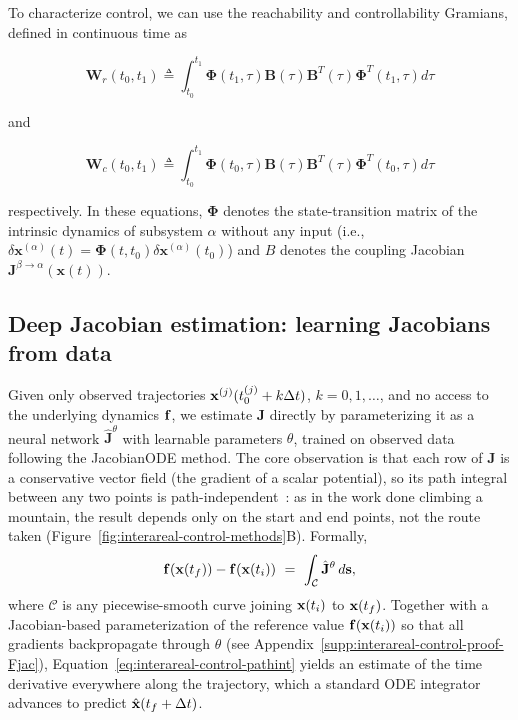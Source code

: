 To characterize control, we can use the reachability and controllability Gramians, defined in continuous time as

\begin{equation}
\mathbf{W}_r(t_0, t_1) \triangleq \int_{t_0}^{t_1}\mathbf{\Phi}(t_1, \tau)\mathbf{B} (\tau)\mathbf{B}^T(\tau){\mathbf{\Phi}}^T(t_1, \tau) d\tau
\end{equation}

and

\begin{equation}
\mathbf{W}_c(t_0, t_1) \triangleq \int_{t_0}^{t_1}\mathbf{\Phi}(t_0, \tau)\mathbf{B} (\tau)\mathbf{B}^T(\tau){\mathbf{\Phi}}^T(t_0, \tau) d\tau
\end{equation}

respectively. In these equations, $\mathbf{\Phi}$ denotes the state-transition matrix of the intrinsic dynamics of subsystem $\alpha$ without any input (i.e., $\delta\mathbf{x}^{(\alpha)}(t) = \mathbf{\Phi}(t, t_0)\delta\mathbf{x}^{(\alpha)}(t_0)$) and $B$ denotes the coupling Jacobian $\mathbf{J}^{\beta\to\alpha}(\mathbf{x}(t))$.\cite{Antsaklis2006-wl}

\subsection{Deep Jacobian estimation: learning Jacobians from data}

Given only observed trajectories $\vb{x}^{(j)}(t_0^{(j)} + k\Delta t)$, $k=0,1,\dots$, and no access to the underlying dynamics $\vb{f}$, we estimate $\mathbf{J}$ directly by parameterizing it as a neural network $\hat{\mathbf{J}}^{\theta}$ with learnable parameters $\theta$, trained on observed data following the JacobianODE method.\cite{Eisen2025-wt} The core observation is that each row of $\mathbf{J}$ is a conservative vector field (the gradient of a scalar potential), so its path integral between any two points is path-independent~\cite{Lorraine2024-qe,Beik-Mohammadi2024-mg}: as in the work done climbing a mountain, the result depends only on the start and end points, not the route taken (Figure~\ref{fig:interareal-control-methods}B). Formally,
\begin{equation}
\vb{f}(\vb{x}(t_f)) - \vb{f}(\vb{x}(t_i)) \ =\ \int_{\mathcal{C}}\hat{\mathbf{J}}^{\theta}\, d\vb{s},
\label{eq:interareal-control-pathint}
\end{equation}
where $\mathcal{C}$ is any piecewise-smooth curve joining $\vb{x}(t_i)$ to $\vb{x}(t_f)$. Together with a Jacobian-based parameterization of the reference value $\vb{f}(\vb{x}(t_i))$ so that all gradients backpropagate through $\theta$ (see Appendix~\ref{supp:interareal-control-proof-Fjac}), Equation~\ref{eq:interareal-control-pathint} yields an estimate of the time derivative everywhere along the trajectory, which a standard ODE integrator advances to predict $\hat{\vb{x}}(t_f + \Delta t)$.

